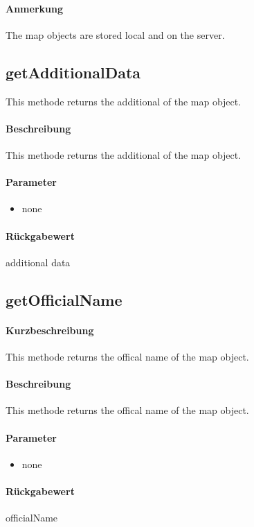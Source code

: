 \paragraph*{Anmerkung}
The map objects are stored local and on the server.

\subsection{getAdditionalData}
This methode returns the additional of the map object.
\paragraph*{Beschreibung}
This methode returns the additional of the map object.
\paragraph*{Parameter}
\begin{itemize}
    \item none
\end{itemize}
\paragraph*{Rückgabewert}
additional data

\subsection{getOfficialName}
\paragraph*{Kurzbeschreibung}
This methode returns the offical name of the map object.
\paragraph*{Beschreibung}
This methode returns the offical name of the map object.
\paragraph*{Parameter}
\begin{itemize}
    \item none
\end{itemize}
\paragraph*{Rückgabewert}
officialName

